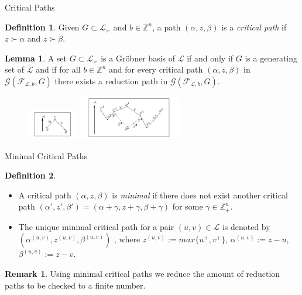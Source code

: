 \documentclass[9pt]{beamer}
\newcommand\F{\mathcal{F}}
\newcommand\G{\mathcal{G}}
\newcommand\Graph{\G(\F_{\mathcal{L}, b}, G)}
\newcommand\Z{\mathbb{Z}}
\theoremstyle{definition}
\newtheorem{remark}{Remark}
\newtheorem{lem}{Lemma}
\newtheorem{defn}{Definition}
\begin{document}
\begin{frame}[fragile]{Critical Paths}
  \begin{defn}
    Given $G \subset \mathcal{L}_{\succ}$ and $b \in  \Z^n$, a path  $(\alpha, z, \beta)$
    is a \emph{critical path} if $z \succ \alpha$ and $z \succ\beta$.
  \end{defn}
  \begin{lem}
    A set $G \subset \mathcal{L}_{\succ}$ is a Gr\"obner basis of $\mathcal{L}$ if and only if $G$
    is a generating set of $\mathcal{L}$ and if for all $b  \in \Z^n$ and for every critical
    path $(\alpha, z, \beta)$ in $\Graph$ there exists a reduction path in $\Graph$.
  \end{lem}
  \begin{figure}
    \includegraphics[width=0.2\textwidth, height=0.2\textheight]{images/critical}
    \includegraphics[width=0.4\textwidth, height=0.2\textheight]{images/critical-reduction}
  \end{figure}
\end{frame}

\begin{frame}[fragile]{Minimal Critical Paths}
  \begin{defn}
    \begin{itemize}
    \item A critical path $(\alpha, z, \beta)$ is \emph{minimal} if there does not
      exist another critical path $(\alpha', z', \beta') = (\alpha + \gamma, z + \gamma, \beta + \gamma)$
      for some $\gamma \in \Z^n_+$.
    \item The unique minimal critical path for a pair $(u, v) \in \mathcal{L}$ is denoted by
      $(\alpha^{(u, v)}, z^{(u,v)}, \beta^{(u,v)})$ , where $z^{(u, v)} := max\{u^+, v^+\}$,
      $\alpha^{(u, v)} := z - u$,       $\beta^{(u, v)} := z - v$.
    \end{itemize}
  \end{defn}
  \begin{remark}
    Using minimal critical paths we reduce the amount of reduction paths to be checked to a finite number.
  \end{remark}
\end{frame}
\end{document}
